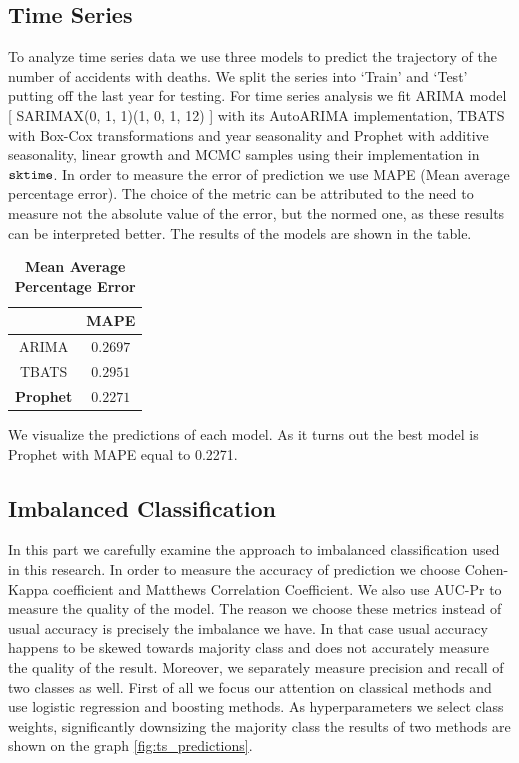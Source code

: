 \subsection{Time Series}

To analyze time series data we use three models to predict the trajectory of the number of accidents with deaths.
We split the series into ‘Train’ and ‘Test’ putting off the last year for testing.
For time series analysis we fit ARIMA model [ SARIMAX(0, 1, 1)(1, 0, 1, 12) ] with its AutoARIMA implementation,
TBATS with Box-Cox transformations and year seasonality and Prophet with additive seasonality,
linear growth and MCMC samples using their implementation in $\verb|sktime|$.
In order to measure the error of prediction we use MAPE (Mean average percentage error).
The choice of the metric can be attributed to the need to measure not the absolute value of the error, but the normed one,
as these results can be interpreted better. The results of the models are shown in the table. \\

\begin{table}[htpb]
	\centering
	\label{tab:mape}
	\begin{tabular}{|c|c|}
		\hline
		& MAPE \\
		\hline
		ARIMA & $0.2697$ \\
		TBATS	& $0.2951$ \\
		\textbf{Prophet}	& $0.2271$ \\ 
		\hline
	\end{tabular}
	\caption{\textbf{Mean Average Percentage Error}}
\end{table}
\noindent
We visualize the predictions of each model. As it turns out the best model is Prophet with MAPE equal to 0.2271.
\subsection{Imbalanced Classification}
In this part we carefully examine the approach to imbalanced classification used in this research.
In order to measure the accuracy of prediction we choose Cohen-Kappa coefficient and Matthews Correlation Coefficient.
We also use AUC-Pr to measure the quality of the model. The reason we choose these metrics instead of usual accuracy is precisely the imbalance we have.
In that case usual accuracy happens to be skewed towards majority class and does not accurately measure the quality of the result.
Moreover, we separately measure precision and recall of two classes as well.
First of all we focus our attention on classical methods and use logistic regression and boosting methods.
As hyperparameters we select class weights, significantly downsizing the majority class the results of two methods are shown on the graph
\ref{fig:ts_predictions}.

